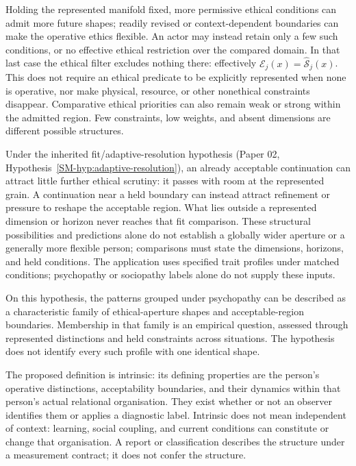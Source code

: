 \documentclass[11pt,a4paper]{article}
\theoremstyle{remark}
\begin{document}
Holding the represented manifold fixed, more permissive ethical conditions can
admit more future shapes; readily revised or context-dependent boundaries can
make the operative ethics flexible. An actor may instead retain only a few
such conditions, or no effective ethical restriction over the compared domain.
In that last case the ethical filter excludes nothing there: effectively
$\mathcal E_j(x)=\widehat{\mathcal S}_j(x)$. This does not require an ethical
predicate to be explicitly represented when none is operative, nor make physical,
resource, or other nonethical constraints disappear. Comparative ethical
priorities can also remain weak or strong within the admitted region. Few
constraints, low weights, and absent dimensions are different possible structures.

Under the inherited fit/adaptive-resolution hypothesis (Paper 02,
Hypothesis~\ref{SM-hyp:adaptive-resolution}), an already acceptable continuation
can attract little further ethical scrutiny: it passes with room at the represented grain.
A continuation near a held boundary can instead attract refinement or pressure
to reshape the acceptable region. What lies outside a represented dimension or
horizon never reaches that fit comparison. These structural possibilities and predictions alone do not establish a
globally wider aperture or a generally more flexible person; comparisons must
state the dimensions, horizons, and held conditions. The application uses
specified trait profiles under matched conditions; psychopathy or sociopathy
labels alone do not supply these inputs.

On this hypothesis, the patterns grouped under psychopathy can be described as
a characteristic family of ethical-aperture shapes and acceptable-region
boundaries. Membership in that family is an empirical question, assessed through
represented distinctions and held constraints across situations. The hypothesis
does not identify every such profile with one identical shape.

The proposed definition is intrinsic: its defining properties are the person's
operative distinctions, acceptability boundaries, and their dynamics within
that person's actual relational organisation. They exist whether or not an
observer identifies them or applies a diagnostic label. Intrinsic does not
mean independent of context: learning, social coupling, and current conditions
can constitute or change that organisation. A report or classification describes
the structure under a measurement contract; it does not confer the structure.
\end{document}
